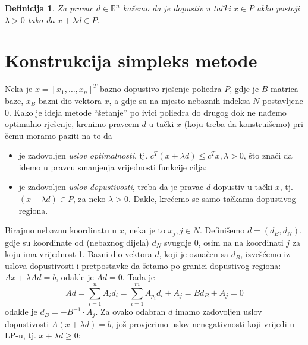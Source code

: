 \documentclass[a4paper, utf8, 11pt, colorlinks]{book}
\newtheorem{definition}{Definicija}
\begin{document}

\begin{definition}
      Za pravac $d\in \mathbb{R}^n$ kažemo da je dopustiv u tački $x \in P$ akko postoji $\lambda > 0$ tako da $x + \lambda d \in P$.
\end{definition}

\section{Konstrukcija simpleks metode}

 Neka je $x = [x_1,\ldots, x_n]^T$ bazno dopustivo rješenje poliedra $P$, gdje je $B$ matrica baze, $x_B$ bazni dio vektora $x$, a gdje su na mjesto nebaznih indeksa $N$ postavljene 0.  Kako je ideja metode ``šetanje'' po ivici poliedra  do drugog dok ne nađemo optimalno rješenje, krenimo pravcem $d$ u  tački $x$ (koju  treba da konstruišemo) pri čemu moramo paziti na to da
\begin{itemize}
    \item je zadovoljen \emph{uslov optimalnosti}, tj. $c^T (x + \lambda d) \leq c^T x, \lambda>0$, što znači da idemo u pravcu smanjenja vrijednosti funkcije cilja;
    \item je zadovoljen \emph{uslov dopustivosti}, treba da je pravac $d$ dopustiv u tački $x$, tj. $ (x + \lambda d) \in P$, za neko $\lambda>0$. Dakle, krećemo se samo tačkama dopustivog regiona. 
\end{itemize}
Birajmo nebaznu koordinatu u $x$, neka je to $x_j, j \in N$. Definišemo $d=(d_B,  d_N)$, gdje su koordinate od (nebaznog dijela) $d_N$ svugdje 0, osim na na koordinati $j$ za koju ima vrijednost 1.   Bazni dio vektora $d$, koji je označen sa $d_B$, izvešćemo iz uslova dopustivosti i pretpostavke da šetamo po granici dopustivog regiona: $Ax + \lambda Ad = b$, odakle je $Ad = 0$. Tada je 
$$ Ad = \sum_{i=1}^n A_i d_i = \sum_{i=1}^m A_{p_i} d_i + A_j = B d_B + A_j = 0$$
odakle je $d_B = -  B^{-1} \cdot A_j $.  Za ovako odabran $d$ imamo zadovoljen uslov dopustivosti $A( x + \lambda d )  =b$, još provjerimo uslov nenegativnosti koji vrijedi u LP-u, tj. $x + \lambda d \geq 0$:
\end{document}
